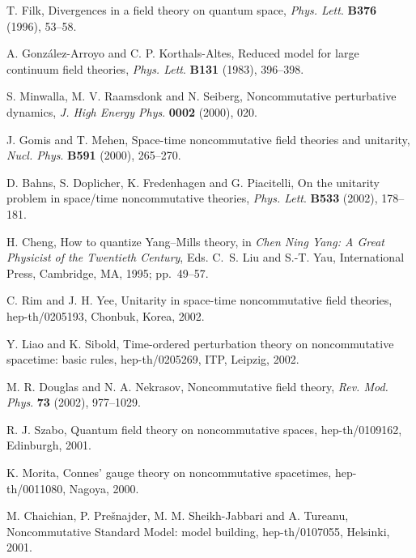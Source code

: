 \documentclass[a4paper,12pt]{article}
\providecommand{\1}{\mathbf{1}}         %
\providecommand{\7}{\dagger}            %
\providecommand{\8}{\bullet}            %
\renewcommand{\.}{\cdot}            %
\renewcommand{\:}{\colon}           %
\begin{document}
\begin{thebibliography}{74}
T. Filk,
Divergences in a field theory on quantum space,
\textit{Phys. Lett}. {\bf B376} (1996), 53--58.

A. Gonz\'alez-Arroyo and C. P. Korthals-Altes,
Reduced model for large \coordHE{} continuum field theories,
\textit{Phys. Lett}. {\bf B131} (1983), 396--398.

S. Minwalla, M. V. Raamsdonk and N. Seiberg,
Noncommutative perturbative dynamics,
\textit{J. High Energy Phys}. {\bf 0002} (2000), 020.

J. Gomis and T. Mehen,
Space-time noncommutative field theories and unitarity,
\textit{Nucl. Phys}. {\bf B591} (2000), 265--270.

D. Bahns, S. Doplicher, K. Fredenhagen and G. Piacitelli,
On the unitarity problem in space/time noncommutative theories,
\textit{Phys. Lett}. {\bf B533} (2002), 178--181.

H. Cheng,
How to quantize Yang--Mills theory,
in \textit{Chen Ning Yang: A Great Physicist of the Twentieth Century},
Eds. C.~S. Liu and S.-T. Yau, International Press, Cambridge, MA, 1995;
pp.~49--57.

C. Rim and J. H. Yee,
Unitarity in space-time noncommutative field theories,
hep-th/0205193, Chonbuk, Korea, 2002.

Y. Liao and K. Sibold,
Time-ordered perturbation theory on noncommutative spacetime:
basic rules,
hep-th/0205269, ITP, Leipzig, 2002.

M. R. Douglas and N. A. Nekrasov,
Noncommutative field theory,
\textit{Rev. Mod. Phys}. {\bf 73} (2002), 977--1029.

R. J. Szabo,
Quantum field theory on noncommutative spaces,
hep-th/0109162, Edinburgh, 2001.

K. Morita,
Connes' gauge theory on noncommutative spacetimes,
hep-th/0011080, Nagoya, 2000.

M. Chaichian, P. Pre\v{s}najder, M. M. Sheikh-Jabbari and A. Tureanu,
Noncommutative Standard Model: model building,
hep-th/0107055, Helsinki, 2001.


\end{thebibliography}
\end{document}
